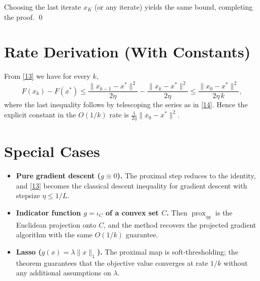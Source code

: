 \documentclass{article}
\begin{document}
Choosing the last iterate $x_{K}$ (or any iterate) yields the same bound, completing the proof.
\qed

\section*{Rate Derivation (With Constants)}
From \eqref{13} we have for every $k$,
\[
F(x_{k})-F(x^{*})\le \frac{\|x_{k-1}-x^{*}\|^{2}}{2\eta}
-\frac{\|x_{k}-x^{*}\|^{2}}{2\eta}
\le \frac{\|x_{0}-x^{*}\|^{2}}{2\eta\,k},
\]
where the last inequality follows by telescoping the series as in \eqref{14}.  
Hence the explicit constant in the $O(1/k)$ rate is $\frac{1}{2\eta}\|x_{0}-x^{*}\|^{2}$.

\section*{Special Cases}
\begin{itemize}
\item \textbf{Pure gradient descent ($g\equiv0$).} The proximal step reduces to the identity, and \eqref{13} becomes the classical descent inequality for gradient descent with stepsize $\eta\le1/L$.
\item \textbf{Indicator function $g=\iota_{C}$ of a convex set $C$.} Then $\operatorname{prox}_{\eta g}$ is the Euclidean projection onto $C$, and the method recovers the projected gradient algorithm with the same $O(1/k)$ guarantee.
\item \textbf{Lasso ($g(x)=\lambda\|x\|_{1}$).} The proximal map is soft‑thresholding; the theorem guarantees that the objective value converges at rate $1/k$ without any additional assumptions on $\lambda$.
\end{itemize}
\end{document}
